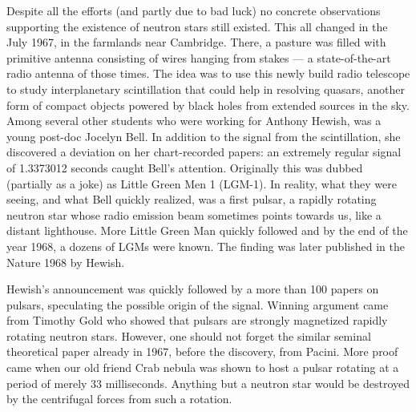 %

Despite all the efforts (and partly due to bad luck) no concrete observations supporting the existence of neutron stars still existed.
This all changed in the July 1967, in the farmlands near Cambridge.
There, a pasture was filled with primitive antenna consisting of wires hanging from stakes --- a state-of-the-art radio antenna of those times.
The idea was to use this newly build radio telescope to study interplanetary scintillation that could help in resolving quasars, another form of compact objects powered by black holes from extended sources in the sky.
Among several other students who were working for Anthony Hewish, was a young post-doc Jocelyn Bell.
In addition to the signal from the scintillation, she discovered a deviation on her chart-recorded papers: 
an extremely regular signal of 1.3373012 seconds caught Bell's attention.
Originally this was dubbed (partially as a joke) as Little Green Men 1 (LGM-1).
In reality, what they were seeing, and what Bell quickly realized, was a first pulsar, a rapidly rotating neutron star whose radio emission beam sometimes points towards us, like a distant lighthouse.
More Little Green Man quickly followed and by the end of the year 1968, a dozens of LGMs were known.
The finding was later published in the Nature 1968 by Hewish.\cite{Hewish68}

Hewish's announcement was quickly followed by a more than 100 papers on pulsars, speculating the possible origin of the signal.
Winning argument came from Timothy Gold who showed that pulsars are strongly magnetized rapidly rotating neutron stars.\cite{Gold68}
However, one should not forget the similar seminal theoretical paper already in 1967, before the discovery, from Pacini.\cite{Pacini67}
More proof came when our old friend Crab nebula was shown to host a pulsar rotating at a period of merely $33$ milliseconds.\cite{CCL69}
Anything but a neutron star would be destroyed by the centrifugal forces from such a rotation.

